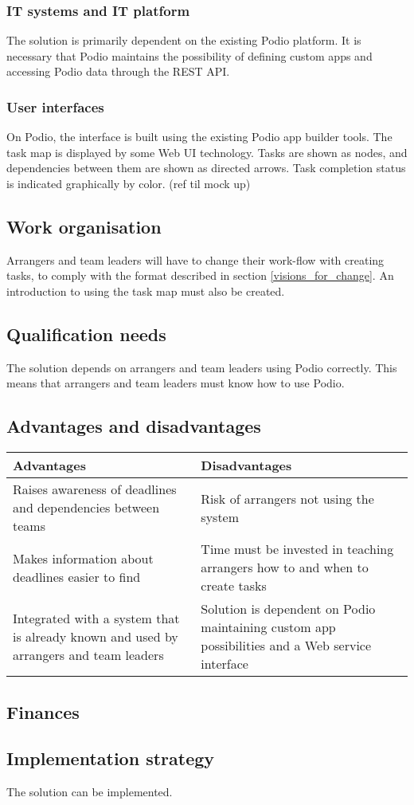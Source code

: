 \subsubsection{IT systems and IT platform}
The solution is primarily dependent on the existing Podio platform. It is necessary that Podio maintains the possibility of defining custom apps and accessing Podio data through the REST API.

\subsubsection{User interfaces}
On Podio, the interface is built using the existing Podio app builder tools. The task map is displayed by some Web UI technology. Tasks are shown as nodes, and dependencies between them are shown as directed arrows. Task completion status is indicated graphically by color. (ref til mock up)

\subsection{Work organisation}
\label{sub:work_organisation}
Arrangers and team leaders will have to change their work-flow with creating tasks, to comply with the format described in section \ref{visions_for_change}. An introduction to using the task map must also be created. 

\subsection{Qualification needs}
\label{sub:qualification_needs}
The solution depends on arrangers and team leaders using Podio correctly. This means that arrangers and team leaders must know how to use Podio.

\subsection{Advantages and disadvantages}
\label{sec:advantages_disadvantages}
\begin{center}
    \begin{tabular}{ | p{7cm} | p{7cm} |}
    \hline
    \textbf{Advantages} & \textbf{Disadvantages}  \\ \hline
     Raises awareness of deadlines and dependencies between teams & Risk of arrangers not using the system\\ \hline
     Makes information about deadlines easier to find & Time must be invested in teaching arrangers how to and when to create tasks\\ \hline
     Integrated with a system that is already known and used by arrangers and team leaders & Solution is dependent on Podio maintaining custom app possibilities and a Web service interface \\ \hline
    \hline
    \end{tabular}
\end{center}


\subsection{Finances}

\subsection{Implementation strategy}
The solution can be implemented.






